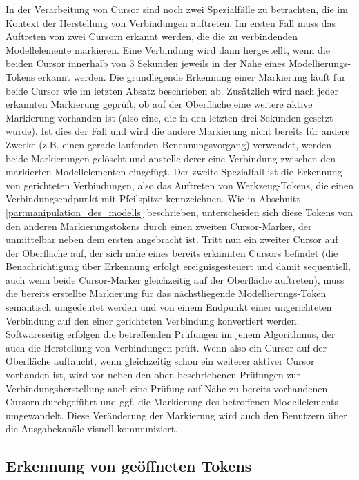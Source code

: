 In der Verarbeitung von Cursor sind noch zwei Spezialfälle zu betrachten, die im Kontext der Herstellung von Verbindungen auftreten. Im ersten Fall muss das Auftreten von zwei Cursorn erkannt werden, die die zu verbindenden Modellelemente markieren. Eine Verbindung wird dann hergestellt, wenn die beiden Cursor innerhalb von 3 Sekunden jeweils in der Nähe eines Modellierungs-Tokens erkannt werden. Die grundlegende Erkennung einer Markierung läuft für beide Cursor wie im letzten Absatz beschrieben ab. Zusätzlich wird nach jeder erkannten Markierung geprüft, ob auf der Oberfläche eine weitere aktive Markierung vorhanden ist (also eine, die in den letzten drei Sekunden gesetzt wurde). Ist dies der Fall und wird die andere Markierung nicht bereits für andere Zwecke (z.B. einen gerade laufenden Benennungsvorgang) verwendet, werden beide Markierungen gelöscht und anstelle derer eine Verbindung zwischen den markierten Modellelementen eingefügt. Der zweite Spezialfall ist die Erkennung von gerichteten Verbindungen, also das Auftreten von Werkzeug-Tokens, die einen Verbindungsendpunkt mit Pfeilspitze kennzeichnen. Wie in Abschnitt \ref{par:manipulation_des_modells} beschrieben, unterscheiden sich diese Tokens von den anderen Markierungstokens durch einen zweiten Cursor-Marker, der unmittelbar neben dem ersten angebracht ist. Tritt nun ein zweiter Cursor auf der Oberfläche auf, der sich nahe eines bereits erkannten Cursors befindet (die Benachrichtigung über Erkennung erfolgt ereignisgesteuert und damit sequentiell, auch wenn beide Cursor-Marker gleichzeitig auf der Oberfläche auftreten), muss die bereits erstellte Markierung für das nächstliegende Modellierungs-Token semantisch umgedeutet werden und von einem Endpunkt einer ungerichteten Verbindung auf den einer gerichteten Verbindung konvertiert werden.
Softwareseitig erfolgen die betreffenden Prüfungen im jenem Algorithmus, der auch die Herstellung von Verbindungen prüft. Wenn also ein Cursor auf der Oberfläche auftaucht, wenn gleichzeitig schon ein weiterer aktiver Cursor vorhanden ist, wird vor neben den oben beschriebenen Prüfungen zur Verbindungsherstellung auch eine Prüfung auf Nähe zu bereits vorhandenen Cursorn durchgeführt und ggf. die Markierung des betroffenen Modellelements umgewandelt. Diese Veränderung der Markierung wird auch den Benutzern über die Ausgabekanäle visuell kommuniziert.


\subsection{Erkennung von geöffneten Tokens} %
\label{sub:erkennung_von_geöffneten_tokens}

